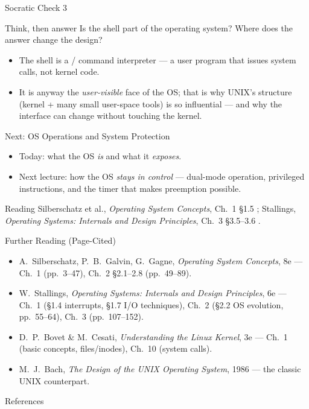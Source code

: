 \documentclass[aspectratio=169]{beamer}
\begin{document}
\begin{frame}{Socratic Check 3}
  \begin{block}{Think, then answer}
    Is the shell part of the operating system? Where does the answer change the
    design?
  \end{block}
  \vspace{0.2cm}
  \begin{itemize}
    \item The shell is a  / command interpreter --- a user
      program that issues system calls, not kernel code.
    \item It is anyway the \emph{user-visible} face of the OS; that is why
      UNIX's structure (kernel + many small user-space tools) is so influential
      --- and why the interface can change without touching the kernel.
  \end{itemize}
\end{frame}

\begin{frame}{Next: OS Operations and System Protection}
  \begin{itemize}
    \item Today: what the OS \emph{is} and what it \emph{exposes}.
    \item Next lecture: how the OS \emph{stays in control} --- dual-mode
      operation, privileged instructions, and the timer that makes
      preemption possible.
  \end{itemize}
  \vspace{0.3cm}
  \begin{block}{Reading}
    Silberschatz et al., \emph{Operating System Concepts}, Ch.~1 \S1.5
    \cite{SilberschatzOSC_operating_system_concepts}; Stallings,
    \emph{Operating Systems: Internals and Design Principles}, Ch.~3
    \S3.5--3.6 \cite{StallingsOS_internals_design_principles}.
  \end{block}
\end{frame}

\begin{frame}{Further Reading (Page-Cited)}
  \footnotesize
  \begin{itemize}
    \item A.~Silberschatz, P.~B.~Galvin, G.~Gagne, \emph{Operating System
      Concepts}, 8e --- Ch.~1 (pp.~3--47), Ch.~2 \S2.1--2.8 (pp.~49--89).
    \item W.~Stallings, \emph{Operating Systems: Internals and Design
      Principles}, 6e --- Ch.~1 (\S1.4 interrupts, \S1.7 I/O techniques),
      Ch.~2 (\S2.2 OS evolution, pp.~55--64), Ch.~3 (pp.~107--152).
    \item D.~P.~Bovet \& M.~Cesati, \emph{Understanding the Linux Kernel},
      3e --- Ch.~1 (basic concepts, files/inodes), Ch.~10 (system calls).
    \item M.~J.~Bach, \emph{The Design of the UNIX Operating System}, 1986 ---
      the classic UNIX counterpart.
  \end{itemize}
  \vspace{0.2cm}
\end{frame}

\begin{frame}[allowframebreaks]{References}
  \footnotesize
  
  
\end{frame}
\end{document}
